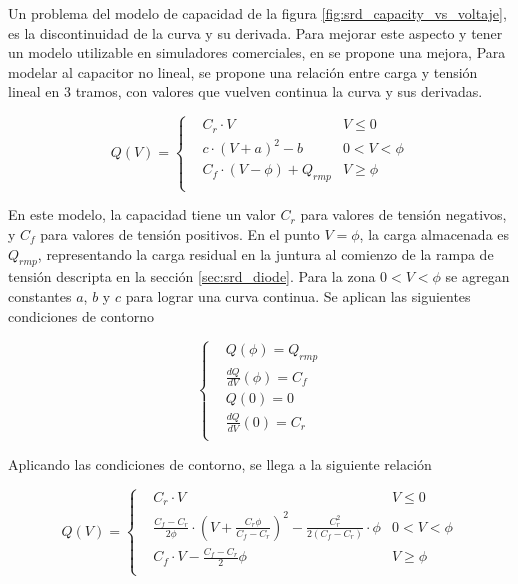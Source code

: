 Un problema del modelo de capacidad de la figura
\ref{fig:srd_capacity_vs_voltaje}, es la discontinuidad de la curva y su
derivada. Para mejorar este aspecto y tener un modelo utilizable en simuladores
comerciales, en \cite{zhang1995} se propone una mejora, Para modelar al
capacitor no lineal, se propone una relación entre carga y tensión lineal en 3
tramos, con valores que vuelven continua la curva y sus derivadas.

\begin{equation}
Q(V) =
    \left\{
    \begin{aligned}
        & C_r \cdot V  & V \leq 0 \\
        & c \cdot \left(V+a \right)^2 -b  & 0 < V < \phi \\
        & C_f \cdot \left( V - \phi \right) + Q_{rmp} & V \geq \phi \\
    \end{aligned}
    \right.
\end{equation}

En este modelo, la capacidad tiene un valor $C_r$ para valores de tensión
negativos, y $C_f$ para valores de tensión positivos. En el punto $V=\phi$, la
carga almacenada es $Q_{rmp}$, representando la carga residual en la juntura al
comienzo de la rampa de tensión descripta en la sección \ref{sec:srd_diode}.
Para la zona $0 < V < \phi$ se agregan constantes $a$, $b$ y $c$ para lograr una
curva continua. Se aplican las siguientes condiciones de contorno

\begin{equation}
    \left\{
    \begin{aligned}
        & Q(\phi) = Q_{rmp} \\
        & \frac{dQ}{dV}(\phi) = C_f \\
        & Q(0) = 0 \\
        & \frac{dQ}{dV}(0) = C_r \\
    \end{aligned}
    \right.
\end{equation}

Aplicando las condiciones de contorno, se llega a la siguiente relación

\begin{equation}
\label{eq:srd_non_linear_cap}
Q(V) =
    \left\{
    \begin{aligned}
        & C_r \cdot V  & V \leq 0 \\
        & \frac{C_f-C_r}{2\phi} \cdot \left(V+\frac{C_r\phi}{C_f-C_r} \right)^2
        -\frac{C_r^2}{2\left(C_f-C_r \right)}\cdot \phi  & 0 < V < \phi \\
        & C_f \cdot V - \frac{C_f-C_r}{2} \phi & V \geq \phi \\
    \end{aligned}
    \right.
\end{equation}


